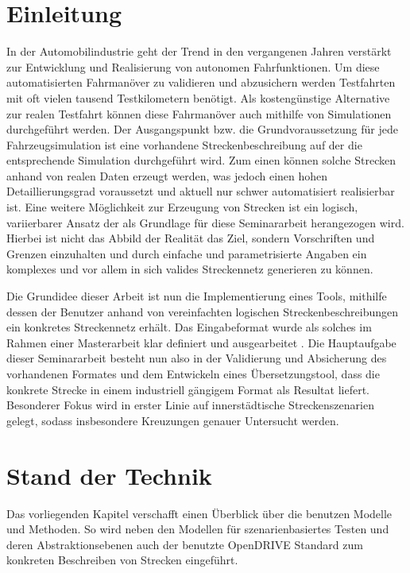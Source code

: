 \thispagestyle{ika}

\chapter{Einleitung}

In der Automobilindustrie geht der Trend in den vergangenen Jahren verstärkt zur Entwicklung und Realisierung von autonomen Fahrfunktionen. Um diese automatisierten Fahrmanöver zu validieren und abzusichern werden Testfahrten mit oft vielen tausend Testkilometern benötigt. Als kostengünstige Alternative zur realen Testfahrt können diese Fahrmanöver auch mithilfe von Simulationen durchgeführt werden. Der Ausgangspunkt bzw. die Grundvoraussetzung für jede Fahrzeugsimulation ist eine vorhandene Streckenbeschreibung auf der die entsprechende Simulation durchgeführt wird. Zum einen können solche Strecken anhand von realen Daten erzeugt werden, was jedoch einen hohen Detaillierungsgrad voraussetzt und aktuell nur schwer automatisiert realisierbar ist. Eine weitere Möglichkeit zur Erzeugung von Strecken ist ein logisch, variierbarer Ansatz der als Grundlage für diese Seminararbeit herangezogen wird. Hierbei ist nicht das Abbild der Realität das Ziel, sondern Vorschriften und Grenzen einzuhalten und durch einfache und parametrisierte Angaben ein komplexes und vor allem in sich valides Streckennetz generieren zu können.

Die Grundidee dieser Arbeit ist nun die Implementierung eines Tools, mithilfe dessen der Benutzer anhand von vereinfachten logischen Streckenbeschreibungen ein konkretes Streckennetz erhält. Das Eingabeformat wurde als solches im Rahmen einer Masterarbeit klar definiert und ausgearbeitet \cite{Russ.2019}. Die Hauptaufgabe dieser Seminararbeit besteht nun also in der Validierung und Absicherung des vorhandenen Formates und dem Entwickeln eines Übersetzungstool, dass die konkrete Strecke in einem industriell gängigem Format als Resultat liefert. Besonderer Fokus wird in erster Linie auf innerstädtische Streckenszenarien gelegt, sodass insbesondere Kreuzungen genauer Untersucht werden.

\chapter{Stand der Technik}
Das vorliegenden Kapitel verschafft einen Überblick über die benutzen Modelle und Methoden. So wird neben den Modellen für szenarienbasiertes Testen und deren Abstraktionsebenen auch der benutzte OpenDRIVE Standard zum konkreten Beschreiben von Strecken eingeführt.

